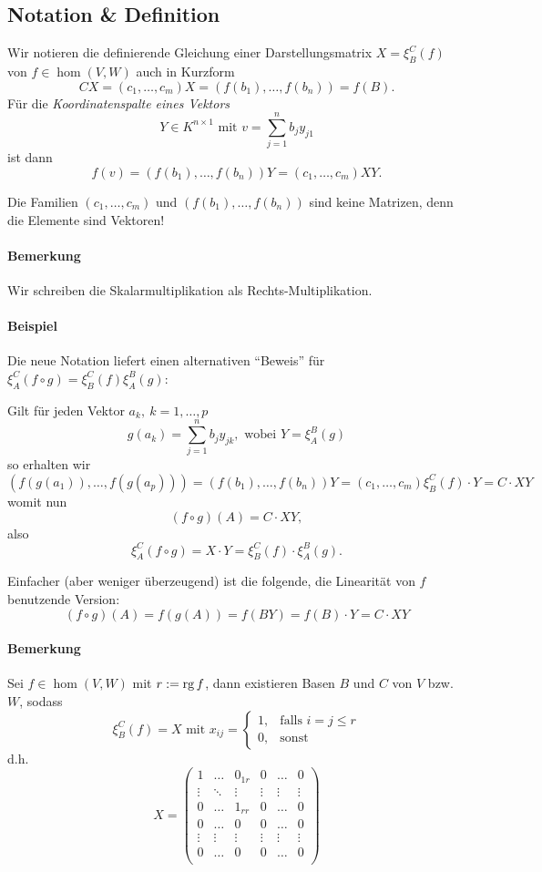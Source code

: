 \subsection{Notation \& Definition}
	\begin{Definition}
	Wir notieren die definierende Gleichung einer Darstellungsmatrix $ X=\xi_B^C(f) $ von $ f\in \hom(V,W) $ auch in Kurzform
		\[ CX=(c_1,\dots,c_m)X = (f(b_1),\dots,f(b_n)) = f(B). \]
	Für die \emph{Koordinatenspalte eines Vektors}
		\[ Y\in K^{n\times 1} \text{ mit } v=\sum_{j=1}^{n}b_jy_{j1} \]
	ist dann
		\[ f(v) = (f(b_1),\dots,f(b_n))Y = (c_1,\dots,c_m)XY. \]
	\end{Definition}
	Die Familien $ (c_1,\dots,c_m) $ und $ (f(b_1),\dots,f(b_n)) $ sind keine Matrizen, denn die Elemente sind Vektoren!

\paragraph{Bemerkung}
	Wir schreiben die Skalarmultiplikation als Rechts-Multiplikation.
\paragraph{Beispiel}
	Die neue Notation liefert einen alternativen "`Beweis"' für $ \xi_A^C(f\circ g) = \xi_B^C(f)\xi_A^B(g) $:
	
	Gilt für jeden Vektor $ a_k,\ k=1,\dots,p $
		\[ g(a_k) = \sum_{j=1}^{n}b_jy_{jk}, \text{ wobei } Y = \xi_A^B(g) \]
	so erhalten wir
		\[ (f(g(a_1)),\dots, f(g(a_p))) = (f(b_1),\dots , f(b_n))Y = (c_1,\dots,c_m)\xi_B^C(f)\cdot Y = C\cdot XY \]
	womit nun
		\[ (f\circ g)(A) = C\cdot XY, \]
	also
		\[ \xi_A^C(f\circ g) = X\cdot Y = \xi_B^C(f)\cdot \xi_A^B(g). \]
        
	Einfacher (aber weniger überzeugend) ist die folgende, die Linearität von $ f $ benutzende Version:
		\[( f\circ g )(A) = f(g(A)) = f(BY) = f(B)\cdot Y = C\cdot XY\]
\paragraph{Bemerkung}
	Sei $ f\in \hom(V,W) $ mit $ r:= \operatorname{rg} f $, dann existieren Basen $ B $ und $ C $ von $ V $ bzw. $ W $, sodass
		\[ \xi_B^C(f) = X \text{ mit } x_{ij} =
			\begin{cases}
			1,& \text{falls }i=j\leq r\\
			0,& \text{sonst}
			\end{cases} \]
	d.h.
		\[ X = \left(\begin{array}{ccc|ccc}
		1      & \dots  & 0_{1r} & 0      &\dots &0 \\
		\vdots & \ddots & \vdots & \vdots &\vdots&\vdots\\
		0      & \dots  & 1_{rr} & 0      &\dots &0 \\\hline
		0      & \dots  & 0      & 0      &\dots &0 \\
		\vdots & \vdots & \vdots & \vdots &\vdots&\vdots \\
                0      & \dots  & 0      & 0      &\dots &0\\
		\end{array}\right) \]
		
